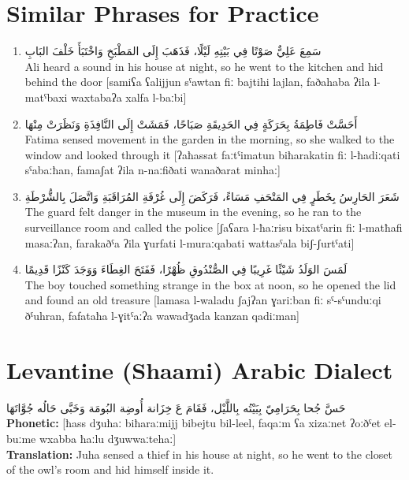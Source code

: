 \documentclass[letter,12pt]{article}
\begin{document}
\section{Similar Phrases for Practice}

\begin{enumerate}
\item \textarabic{سَمِعَ عَلِيٌّ صَوْتًا فِي بَيْتِهِ لَيْلًا، فَذَهَبَ إِلَى المَطْبَخِ وَاخْتَبَأَ خَلْفَ البَابِ}\\
Ali heard a sound in his house at night, so he went to the kitchen and hid behind the door [samiʕa ʕalijjun sˤawtan fiː bajtihi lajlan, faðahaba ʔila l-matˤbaxi waxtabaʔa xalfa l-baːbi]

\item \textarabic{أَحَسَّتْ فَاطِمَةُ بِحَرَكَةٍ فِي الحَدِيقَةِ صَبَاحًا، فَمَشَتْ إِلَى النَّافِذَةِ وَنَظَرَتْ مِنْهَا}\\
Fatima sensed movement in the garden in the morning, so she walked to the window and looked through it [ʔaħassat faːtˤimatun biħarakatin fiː l-ħadiːqati sˤabaːħan, famaʃat ʔila n-naːfiðati wanaðarat minhaː]

\item \textarabic{شَعَرَ الحَارِسُ بِخَطَرٍ فِي المَتْحَفِ مَسَاءً، فَرَكَضَ إِلَى غُرْفَةِ المُرَاقَبَةِ وَاتَّصَلَ بِالشُّرْطَةِ}\\
The guard felt danger in the museum in the evening, so he ran to the surveillance room and called the police [ʃaʕara l-ħaːrisu bixatˤarin fiː l-matħafi masaːʔan, farakaðˤa ʔila ɣurfati l-muraːqabati wattasˤala biʃ-ʃurtˤati]

\item \textarabic{لَمَسَ الوَلَدُ شَيْئًا غَرِيبًا فِي الصُّنْدُوقِ ظُهْرًا، فَفَتَحَ الغِطَاءَ وَوَجَدَ كَنْزًا قَدِيمًا}\\
The boy touched something strange in the box at noon, so he opened the lid and found an old treasure [lamasa l-waladu ʃajʔan ɣariːban fiː sˤ-sˤunduːqi ðˤuhran, fafataħa l-ɣitˤaːʔa wawadʒada kanzan qadiːman]
\end{enumerate}

\section{Levantine (Shaami) Arabic Dialect}

\begin{tcolorbox}[colback=white,colframe=dialectcolor,title=\textbf{Levantine Version},breakable]
\textarabic{حَسَّ جُحا بِحَرَامِيّ بِبَيْتُه بِاللَّيْل، فَقَامَ عَ خِزَانة أُوضِة البُومَة وَخَبَّى حَالُه جُوَّاتَهَا}\\
\textbf{Phonetic:} [ħass dʒuħaː biħaraːmijj bibejtu bil-leel, faqaːm ʕa xizaːnet ʔoːðˤet el-buːme wxabba ħaːlu dʒuwwaːtehaː]\\
\textbf{Translation:} Juha sensed a thief in his house at night, so he went to the closet of the owl's room and hid himself inside it.
\end{tcolorbox}
\end{document}
